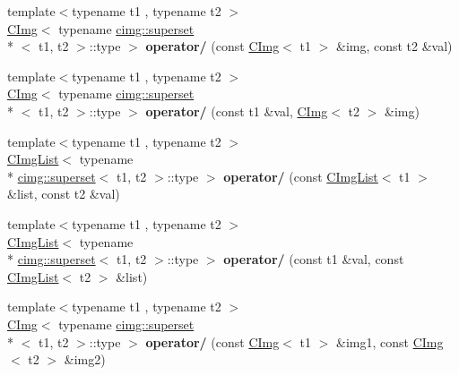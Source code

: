 \begin{DoxyCompactItemize}
\item 
\hypertarget{namespacecimg__library_af55868a78c853f1b85baeb78482af6b5}{{\footnotesize template$<$typename t1 , typename t2 $>$ }\\\hyperlink{structcimg__library_1_1_c_img}{C\-Img}$<$ typename \hyperlink{structcimg__library_1_1cimg_1_1superset}{cimg\-::superset}\\*
$<$ t1, t2 $>$\-::type $>$ {\bfseries operator/} (const \hyperlink{structcimg__library_1_1_c_img}{C\-Img}$<$ t1 $>$ \&img, const t2 \&val)}\label{namespacecimg__library_af55868a78c853f1b85baeb78482af6b5}

\item 
\hypertarget{namespacecimg__library_aa0942457af1e7ed9197b758484836e3a}{{\footnotesize template$<$typename t1 , typename t2 $>$ }\\\hyperlink{structcimg__library_1_1_c_img}{C\-Img}$<$ typename \hyperlink{structcimg__library_1_1cimg_1_1superset}{cimg\-::superset}\\*
$<$ t1, t2 $>$\-::type $>$ {\bfseries operator/} (const t1 \&val, \hyperlink{structcimg__library_1_1_c_img}{C\-Img}$<$ t2 $>$ \&img)}\label{namespacecimg__library_aa0942457af1e7ed9197b758484836e3a}

\item 
\hypertarget{namespacecimg__library_a05cd579c9885d1bf2edbf26dc7acdafe}{{\footnotesize template$<$typename t1 , typename t2 $>$ }\\\hyperlink{structcimg__library_1_1_c_img_list}{C\-Img\-List}$<$ typename \\*
\hyperlink{structcimg__library_1_1cimg_1_1superset}{cimg\-::superset}$<$ t1, t2 $>$\-::type $>$ {\bfseries operator/} (const \hyperlink{structcimg__library_1_1_c_img_list}{C\-Img\-List}$<$ t1 $>$ \&list, const t2 \&val)}\label{namespacecimg__library_a05cd579c9885d1bf2edbf26dc7acdafe}

\item 
\hypertarget{namespacecimg__library_ada440d0421254a53c9a142cb7fef786e}{{\footnotesize template$<$typename t1 , typename t2 $>$ }\\\hyperlink{structcimg__library_1_1_c_img_list}{C\-Img\-List}$<$ typename \\*
\hyperlink{structcimg__library_1_1cimg_1_1superset}{cimg\-::superset}$<$ t1, t2 $>$\-::type $>$ {\bfseries operator/} (const t1 \&val, const \hyperlink{structcimg__library_1_1_c_img_list}{C\-Img\-List}$<$ t2 $>$ \&list)}\label{namespacecimg__library_ada440d0421254a53c9a142cb7fef786e}

\item 
\hypertarget{namespacecimg__library_a11170bf2e083dd10359e43c0cb756495}{{\footnotesize template$<$typename t1 , typename t2 $>$ }\\\hyperlink{structcimg__library_1_1_c_img}{C\-Img}$<$ typename \hyperlink{structcimg__library_1_1cimg_1_1superset}{cimg\-::superset}\\*
$<$ t1, t2 $>$\-::type $>$ {\bfseries operator/} (const \hyperlink{structcimg__library_1_1_c_img}{C\-Img}$<$ t1 $>$ \&img1, const \hyperlink{structcimg__library_1_1_c_img}{C\-Img}$<$ t2 $>$ \&img2)}\label{namespacecimg__library_a11170bf2e083dd10359e43c0cb756495}


\end{DoxyCompactItemize}
